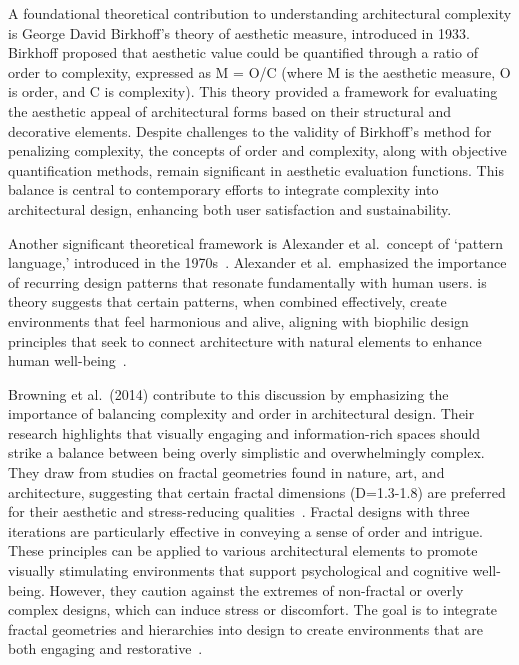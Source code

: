 A foundational theoretical contribution to understanding architectural complexity is George David Birkhoff's theory of aesthetic measure, introduced in 1933.
Birkhoff proposed that aesthetic value could be quantified through a ratio of order to complexity, expressed as M = O/C (where M is the aesthetic measure, O is order, and C is complexity)\cite{Douchova2016}.
This theory provided a framework for evaluating the aesthetic appeal of architectural forms based on their structural and decorative elements.
Despite challenges to the validity of Birkhoff's method for penalizing complexity, the concepts of order and complexity, along with objective quantification methods, remain significant in aesthetic evaluation functions\cite{Javaheri2016}.
This balance is central to contemporary efforts to integrate complexity into architectural design, enhancing both user satisfaction and sustainability.

Another significant theoretical framework is Alexander et al.~concept of `pattern language,' introduced in the 1970s~\cite{Alexander1977}.
Alexander et al.~emphasized the importance of recurring design patterns that resonate fundamentally with human users.
is theory suggests that certain patterns, when combined effectively, create environments that feel harmonious and alive, aligning with biophilic design principles that seek to connect architecture with natural elements to enhance human well-being~\cite{Downton2017}.

Browning et al.~(2014) contribute to this discussion by emphasizing the importance of balancing complexity and order in architectural design.
Their research highlights that visually engaging and information-rich spaces should strike a balance between being overly simplistic and overwhelmingly complex.
They draw from studies on fractal geometries found in nature, art, and architecture, suggesting that certain fractal dimensions (D=1.3-1.8) are preferred for their aesthetic and stress-reducing qualities~\cite{Browning2014}.
Fractal designs with three iterations are particularly effective in conveying a sense of order and intrigue.
These principles can be applied to various architectural elements to promote visually stimulating environments that support psychological and cognitive well-being.
However, they caution against the extremes of non-fractal or overly complex designs, which can induce stress or discomfort.
The goal is to integrate fractal geometries and hierarchies into design to create environments that are both engaging and restorative~\cite{Browning2014}.

